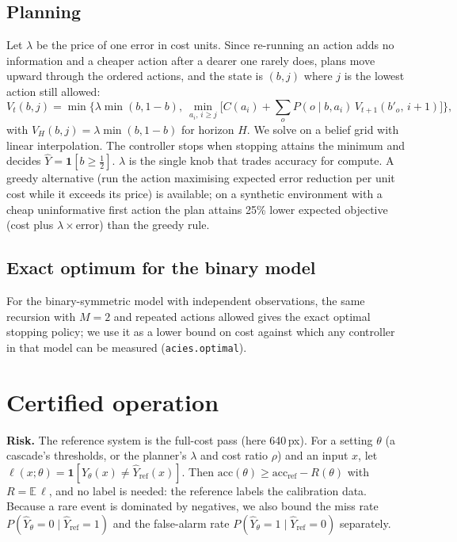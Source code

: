 \documentclass[11pt]{article}
\begin{document}
\subsection{Planning}
Let $\lambda$ be the price of one error in cost units. Since re-running an action adds no
information and a cheaper action after a dearer one rarely does, plans move upward through the
ordered actions, and the state is $(b,j)$ where $j$ is the lowest action still allowed:
\begin{equation}
  V_t(b,j)=\min\Big\{\lambda\min(b,1{-}b),\ \min_{a_i,\,i\ge j}\Big[C(a_i)+\sum_{o}P(o\mid b,a_i)\,V_{t+1}(b'_{o},\,i{+}1)\Big]\Big\},
  \label{eq:bellman}
\end{equation}
with $V_H(b,j)=\lambda\min(b,1{-}b)$ for horizon $H$. We solve  on a belief grid
with linear interpolation. The controller stops when stopping attains the minimum and decides
$\hat Y=\mathbf 1[b\ge\tfrac12]$. $\lambda$ is the single knob that trades accuracy for compute.
A greedy alternative (run the action maximising expected error reduction per unit cost while it
exceeds its price) is available; on a synthetic environment with a cheap uninformative first action
the plan attains 25\% lower expected objective (cost plus $\lambda\times$error) than the greedy rule.

\subsection{Exact optimum for the binary model}
For the binary-symmetric model with independent observations, the same recursion with $M=2$
and repeated actions allowed gives the exact optimal stopping policy; we use it as a lower bound
on cost against which any controller in that model can be measured (\texttt{acies.optimal}).

\section{Certified operation}
\label{sec:certified}

\textbf{Risk.} The reference system is the full-cost pass (here 640\,px). For a setting $\theta$
(a cascade's thresholds, or the planner's $\lambda$ and cost ratio $\rho$) and an input $x$, let
$\ell(x;\theta)=\mathbf 1[\hat Y_\theta(x)\ne\hat Y_{\mathrm{ref}}(x)]$. Then
$\mathrm{acc}(\theta)\ge\mathrm{acc}_{\mathrm{ref}}-R(\theta)$ with $R=\mathbb E\,\ell$, and no
label is needed: the reference labels the calibration data. Because a rare event is dominated by
negatives, we also bound the miss rate $P(\hat Y_\theta{=}0\mid \hat Y_{\mathrm{ref}}{=}1)$ and the false-alarm
rate $P(\hat Y_\theta{=}1\mid \hat Y_{\mathrm{ref}}{=}0)$ separately.
\end{document}
